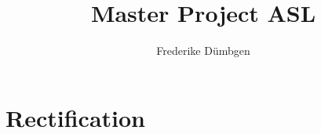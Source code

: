 \documentclass{report}
\begin{document}
\title{Master Project ASL}
\author{Frederike Dümbgen}

\maketitle

\chapter{Rectification}


\nocite{*} %



\end{document}
